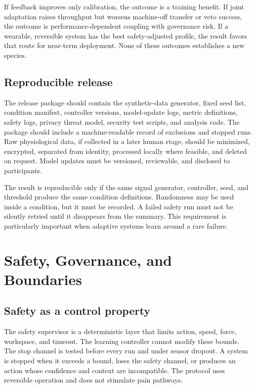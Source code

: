 \documentclass[conference]{IEEEtran}
\begin{document}
If feedback improves only calibration, the outcome is a training benefit. If joint adaptation raises throughput but worsens machine-off transfer or veto success, the outcome is performance-dependent coupling with governance risk. If a wearable, reversible system has the best safety-adjusted profile, the result favors that route for near-term deployment. None of these outcomes establishes a new species.

\subsection{Reproducible release}

The release package should contain the synthetic-data generator, fixed seed list, condition manifest, controller versions, model-update logs, metric definitions, safety logs, privacy threat model, security test scripts, and analysis code. The package should include a machine-readable record of exclusions and stopped runs. Raw physiological data, if collected in a later human stage, should be minimized, encrypted, separated from identity, processed locally where feasible, and deleted on request. Model updates must be versioned, reviewable, and disclosed to participants.

The result is reproducible only if the same signal generator, controller, seed, and threshold produce the same condition definitions. Randomness may be used inside a condition, but it must be recorded. A failed safety run must not be silently retried until it disappears from the summary. This requirement is particularly important when adaptive systems learn around a rare failure.

\section{Safety, Governance, and Boundaries}

\subsection{Safety as a control property}

The safety supervisor is a deterministic layer that limits action, speed, force, workspace, and timeout. The learning controller cannot modify these bounds. The stop channel is tested before every run and under sensor dropout. A system is stopped when it exceeds a bound, loses the safety channel, or produces an action whose confidence and context are incompatible. The protocol uses reversible operation and does not stimulate pain pathways.
\end{document}
